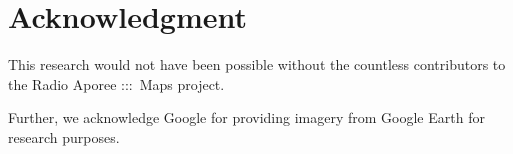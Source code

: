 \documentclass[journal]{IEEEtran}
\begin{document}
\section*{Acknowledgment}
This research would not have been possible without the
countless contributors to the Radio Aporee :::~Maps project.

Further, we acknowledge Google for providing imagery from Google Earth for research purposes.







\end{document}
